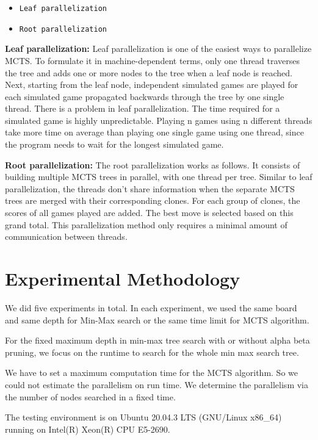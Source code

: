 \documentclass[sigconf]{acmart}
\begin{document}
\begin{itemize}
\item {\verb|Leaf parallelization|}
\item {\verb|Root parallelization|}
\end{itemize}

{\bfseries Leaf parallelization:}
Leaf parallelization is one of the easiest ways to parallelize MCTS. To formulate it in machine-dependent terms, only one thread traverses the tree and adds one or more nodes to the tree when a leaf node is reached. Next, starting from the leaf node, independent simulated games are played for each simulated game propagated backwards through the tree by one single thread. 
There is a problem in leaf parallelization. The time required for a simulated game is highly unpredictable. Playing n games using n different threads take more time on average than playing one single game using one thread, since the program needs to wait for the longest simulated game. 

{\bfseries Root parallelization:}
The root parallelization works as follows. It consists of building multiple MCTS trees in parallel, with one thread per tree. Similar to leaf parallelization, the threads don’t share information when the separate MCTS trees are merged with their corresponding clones. For each group of clones, the scores of all games played are added. The best move is selected based on this grand total. This parallelization method only requires a minimal amount of communication between threads.



\section{Experimental Methodology}

We did five experiments in total. In each experiment, we used the same board and same depth for Min-Max search or the same time limit for MCTS algorithm.

For the fixed maximum depth in min-max tree search with or without alpha beta pruning, we focus on the runtime to search for the whole min max search tree. 

We have to set a maximum computation time for the MCTS algorithm. So we could not estimate the parallelism on run time. We determine the parallelism via the number of nodes searched in a fixed time. 

The testing environment is on Ubuntu 20.04.3 LTS (GNU/Linux x86\_64) running on Intel(R) Xeon(R) CPU E5-2690. 
\end{document}
